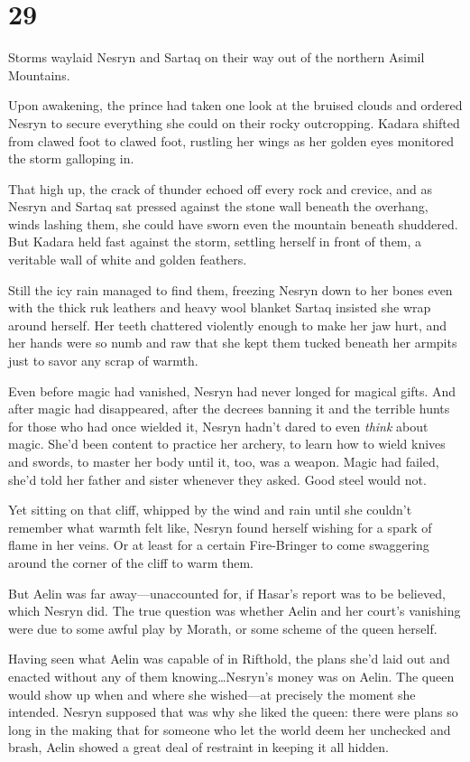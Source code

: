 
\chapter{29}

Storms waylaid Nesryn and Sartaq on their way out of the northern Asimil Mountains.

Upon awakening, the prince had taken one look at the bruised clouds and ordered Nesryn to secure everything she could on their rocky outcropping.
Kadara shifted from clawed foot to clawed foot, rustling her wings as her golden eyes monitored the storm galloping in.

That high up, the crack of thunder echoed off every rock and crevice, and as Nesryn and Sartaq sat pressed against the stone wall beneath the overhang, winds lashing them, she could have sworn even the mountain beneath shuddered.
But Kadara held fast against the storm, settling herself in front of them, a veritable wall of white and golden feathers.

Still the icy rain managed to find them, freezing Nesryn down to her bones even with the thick ruk leathers and heavy wool blanket Sartaq insisted she wrap around herself.
Her teeth chattered violently enough to make her jaw hurt, and her hands were so numb and raw that she kept them tucked beneath her armpits just to savor any scrap of warmth.

Even before magic had vanished, Nesryn had never longed for magical gifts.
And after magic had disappeared, after the decrees banning it and the terrible hunts for those who had once wielded it, Nesryn hadn't dared to even \emph{think} about magic.
She'd been content to practice her archery, to learn how to wield knives and swords, to master her body until it, too, was a weapon.
Magic had failed, she'd told her father and sister whenever they asked.
Good steel would not.

Yet sitting on that cliff, whipped by the wind and rain until she couldn't remember what warmth felt like, Nesryn found herself wishing for a spark of flame in her veins.
Or at least for a certain Fire-Bringer to come swaggering around the corner of the cliff to warm them.

But Aelin was far away---unaccounted for, if Hasar's report was to be believed, which Nesryn did.
The true question was whether Aelin and her court's vanishing were due to some awful play by Morath, or some scheme of the queen herself.

Having seen what Aelin was capable of in Rifthold, the plans she'd laid out and enacted without any of them knowing\ldots Nesryn's money was on Aelin.
The queen would show up when and where she wished---at precisely the moment she intended.
Nesryn supposed that was why she liked the queen: there were plans so long in the making that for someone who let the world deem her unchecked and brash, Aelin showed a great deal of restraint in keeping it all hidden.

